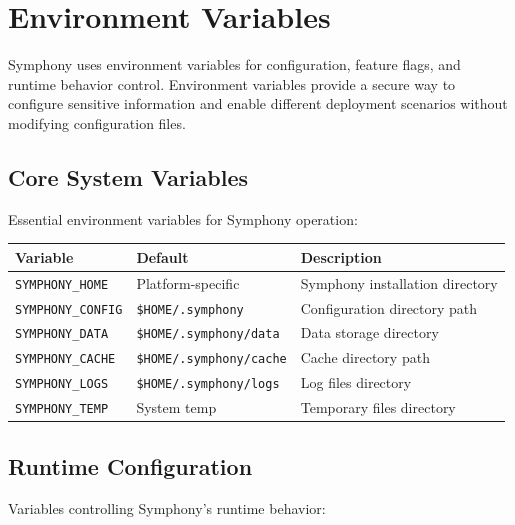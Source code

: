 \section*{Environment Variables}

Symphony uses environment variables for configuration, feature flags, and runtime behavior control. Environment variables provide a secure way to configure sensitive information and enable different deployment scenarios without modifying configuration files.

\subsection*{Core System Variables}

Essential environment variables for Symphony operation:

\begin{center}
\begin{tabular}{@{}p{4cm}p{3cm}p{5cm}@{}}
\toprule
\textbf{Variable} & \textbf{Default} & \textbf{Description} \\
\midrule
\texttt{SYMPHONY\_HOME} & Platform-specific & Symphony installation directory \\
\texttt{SYMPHONY\_CONFIG} & \texttt{\$HOME/.symphony} & Configuration directory path \\
\texttt{SYMPHONY\_DATA} & \texttt{\$HOME/.symphony/data} & Data storage directory \\
\texttt{SYMPHONY\_CACHE} & \texttt{\$HOME/.symphony/cache} & Cache directory path \\
\texttt{SYMPHONY\_LOGS} & \texttt{\$HOME/.symphony/logs} & Log files directory \\
\texttt{SYMPHONY\_TEMP} & System temp & Temporary files directory \\
\bottomrule
\end{tabular}
\end{center}

\subsection*{Runtime Configuration}

Variables controlling Symphony's runtime behavior:

